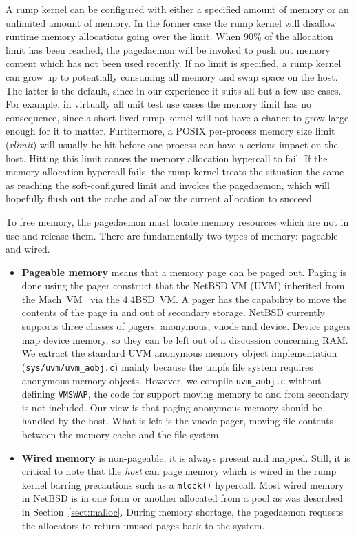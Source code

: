 A rump kernel can be configured with either a specified amount of memory
or an unlimited amount of memory.  In the former case the rump
kernel will disallow runtime memory allocations going over the
limit.  When 90\% of the allocation limit has been reached, the
pagedaemon will be invoked to push out memory content which has
not been used recently.  If no limit is specified, a rump kernel
can grow up to potentially consuming all memory and swap space on
the host.  The latter is the default, since in our experience it
suits all but a few use cases.  For example, in virtually all unit
test use cases the memory limit has no consequence, since a
short-lived rump kernel will not have a chance to grow large enough
for it to matter.  Furthermore, a POSIX per-process memory size
limit (\textit{rlimit}) will usually be hit before one process can
have a serious impact on the host.  Hitting this limit causes the memory
allocation hypercall to fail.  If the memory allocation hypercall
fails, the rump kernel treats the situation the same as reaching the
soft-configured limit and invokes the pagedaemon, which will hopefully
flush out the cache and allow the current allocation to succeed.

To free memory, the pagedaemon must locate memory resources which
are not in use and release them.  There are fundamentally two types
of memory: pageable and wired.

\begin{itemize}
\item   \textbf{Pageable memory} means that a memory page can be
	paged out.  Paging is done using the pager construct that the
	NetBSD VM (UVM) inherited from the Mach~VM~\cite{rashid:machvm}
	via the 4.4BSD~VM.  A pager has the capability to move the
	contents of the page in and out of secondary storage.
	NetBSD currently supports three classes of pagers: anonymous,
	vnode and device.  Device pagers map device memory, so they
	can be left out of a discussion concerning RAM.  We extract
	the standard UVM anonymous memory object implementation
	(\verb+sys/uvm/uvm_aobj.c+) mainly because the tmpfs file
	system requires anonymous memory objects.  However, we
	compile \verb+uvm_aobj.c+ without defining \texttt{VMSWAP},
	\ie the code for support moving memory to and from secondary
	is not included.  Our view is that paging anonymous memory
	should be handled by the host.  What is left is the vnode pager,
	\ie moving file contents between the memory cache and the
	file system.

\item   \textbf{Wired memory} is non-pageable, \ie it is always present
	and mapped.  Still, it is critical to note that the
	\textit{host} can page memory which is wired in the rump
	kernel barring precautions such as a \texttt{mlock()}
	hypercall.  Most wired memory in NetBSD is in one form or
	another allocated from a pool as was described in
	Section~\ref{sect:malloc}.  During memory shortage, the
	pagedaemon requests the allocators to return unused pages
	back to the system.
\end{itemize}


